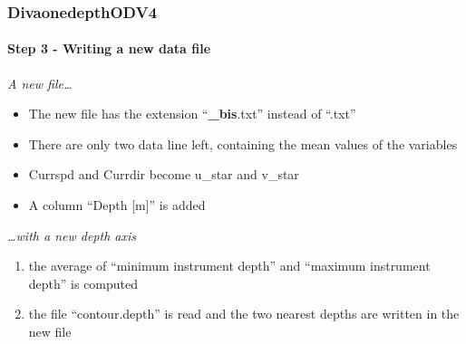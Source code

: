 \begin{frame}
\frametitle{DivaonedepthODV4}
\framesubtitle{Step 3 - Writing a new data file}

\emph{A new file\ldots}
\begin{itemize}
 \item The new file has the extension ``\textbf{\_bis}.txt'' instead of ``.txt''
 \item There are only two data line left, containing the mean values of the variables
 \item Currspd and Currdir become u\_star and v\_star
 \item A column ``Depth [m]'' is added
\end{itemize}

\pause
\vspace{0.2cm}

\emph{\ldots with a new depth axis}
\begin{enumerate}
\item the average of ``minimum instrument depth'' and ``maximum instrument depth'' is computed
\item the file ``contour.depth'' is read and the two nearest depths are written in the new file
\end{enumerate}


\end{frame}

